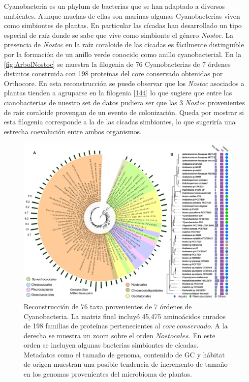 \documentclass[12pt,twoside]{reedthesis}
\begin{document}
  Cyanobacteria es un phylum de bacterias que se han adaptado a diversos
  ambientes. Aunque muchas de ellas son marinas algunas Cyanobacterias
  viven como simbiontes de plantas. En particular las cícadas han
  desarrollado un tipo especial de raíz donde se sabe que vive como
  simbionte el género \emph{Nostoc}. La presencia de \emph{Nostoc} en la
  raíz coraloide de las cícadas es fácilmente distinguible por la
  formación de un anillo verde conocido como anillo cyanobacterial. En la
  \autoref{fig:ArbolNostoc} se muestra la filogenia de 76 Cyanobacterias
  de 7 órdenes distintos construida con 198 proteínas del core conservado
  obtenidas por Orthocore. En esta reconstrucción se puede observar que
  los \emph{Nostoc} asociados a plantas tienden a agruparse en la
  filogenia {[}\protect\hyperlink{ref-gutierrez-garcia_cycad_2019}{144}{]}
  lo que sugiere que entre las cianobacterias de nuestro set de datos
  pudiera ser que las 3 \emph{Nostoc} provenientes de raíz coraloide
  provengan de un evento de colonización. Queda por mostrar si esta
  filogenia corresponde a la de las cícadas simbiontes, lo que sugeriría
  una estrecha coevolución entre ambos organismos.
  
  \begin{figure}[h!tbp]
  \centering
  \includegraphics[angle = 0,scale = .45]{chapter1/Nostoc.png}
  \caption[Arbol filogenético de $Nostoc$ construido utilizando  la selección de genes del $core~conservado$]{\footnotesize{Reconstrucción de 76 taxa provenientes de 7 órdenes de Cyanobacteria. La matriz final incluyó 45,475 aminoácidos curados de 198 familias de proteínas pertenecientes al $core~conservado$. A la derecha se muestra un zoom sobre el orden $Nostocales$. En este orden se incluyen algunas bacterias simbiontes de cícadas. Metadatos como el tamaño de genoma, contenido de GC y hábitat de origen muestran una posible tendencia de incremento de tamaño en los genomas provenientes del microbioma de plantas.}}
  \label{fig:ArbolNostoc}
  \end{figure}
  
\end{document}
